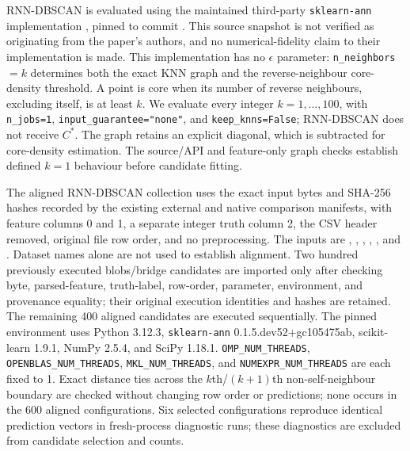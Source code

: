 \documentclass[review,12pt]{elsarticle}
\begin{document}
RNN-DBSCAN \citep{BryantCios2018RNNDBSCAN} is evaluated using the maintained
third-party \texttt{sklearn-ann} implementation \citep{SklearnAnnRNNDBSCAN},
pinned to commit
\texttt{}.
This source snapshot is not verified as originating from the paper's authors,
and no numerical-fidelity claim to their implementation is made. This
implementation has no $\epsilon$ parameter: \texttt{n\_neighbors}$=k$
determines both the exact KNN graph and the reverse-neighbour core-density
threshold. A point is core when its number of reverse neighbours, excluding
itself, is at least $k$. We evaluate every integer $k=1,\ldots,100$, with
\texttt{n\_jobs=1}, \texttt{input\_guarantee="none"}, and
\texttt{keep\_knns=False}; RNN-DBSCAN does not receive $C^*$.
The graph retains an explicit diagonal, which is subtracted for core-density
estimation. The source/API and feature-only graph checks establish defined
$k=1$ behaviour before candidate fitting.

The aligned RNN-DBSCAN collection uses the exact input bytes and SHA-256 hashes
recorded by the existing external and native comparison manifests, with
feature columns 0 and 1, a separate integer truth column 2, the CSV header
removed, original file row order, and no preprocessing. The inputs are
, ,
, ,
, and .
Dataset names alone are not used to establish alignment. Two hundred
previously executed blobs/bridge candidates are imported only after checking
byte, parsed-feature, truth-label, row-order, parameter, environment, and
provenance equality; their original execution identities and hashes are
retained. The remaining 400 aligned candidates are executed sequentially.
The pinned environment uses Python 3.12.3, \texttt{sklearn-ann}
0.1.5.dev52+gc105475ab, scikit-learn 1.9.1, NumPy 2.5.4, and SciPy 1.18.1.
\texttt{OMP\_NUM\_THREADS}, \texttt{OPENBLAS\_NUM\_THREADS},
\texttt{MKL\_NUM\_THREADS}, and \texttt{NUMEXPR\_NUM\_THREADS} are each
fixed to 1. Exact distance ties across the $k$th/$(k+1)$th non-self-neighbour
boundary are checked without changing row order or predictions; none occurs
in the 600 aligned configurations. Six selected configurations reproduce
identical prediction vectors in fresh-process diagnostic runs; these
diagnostics are excluded from candidate selection and counts.
\end{document}
